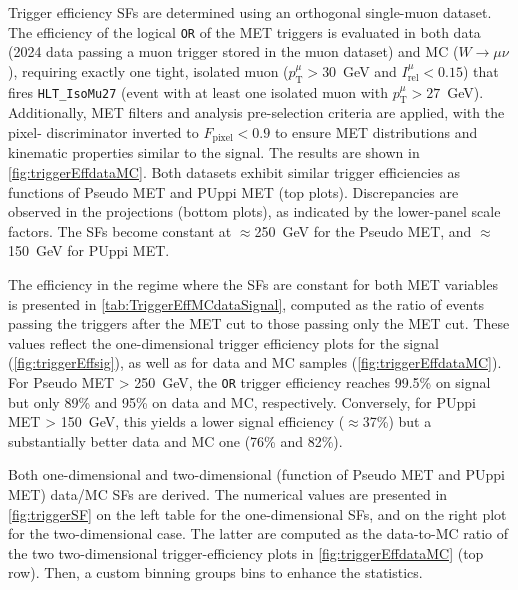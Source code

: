 Trigger efficiency SFs are determined using an orthogonal single-muon dataset. The efficiency of the logical \texttt{OR} of the MET triggers is evaluated in both data (2024 data passing a muon trigger stored in the muon dataset) and MC ($W\to\mu\nu$), requiring exactly one tight, isolated muon ($p_{\mathrm{T}}^\mu>30$~GeV and $I_{\text{rel}}^\mu<0.15$) that fires \texttt{HLT\_IsoMu27} (event with at least one isolated muon with $p_{\mathrm{T}}^\mu>27$~GeV). Additionally, MET filters and analysis pre-selection criteria are applied, with the pixel-\dedx{} discriminator inverted to $F_{\text{pixel}}<0.9$ to ensure MET distributions and kinematic properties similar to the signal. The results are shown in \cref{fig:triggerEffdataMC}. Both datasets exhibit similar trigger efficiencies as functions of Pseudo MET and PUppi MET (top plots). Discrepancies are observed in the projections (bottom plots), as indicated by the lower-panel scale factors. The SFs become constant at $\approx$250~GeV for the Pseudo MET, and $\approx$150~GeV for PUppi MET.

\vspace{0.5 cm}

The efficiency in the regime where the SFs are constant for both MET variables is presented in \cref{tab:TriggerEffMCdataSignal}, computed as the ratio of events passing the triggers after the MET cut to those passing only the MET cut. These values reflect the one-dimensional trigger efficiency plots for the signal (\cref{fig:triggerEffsig}), as well as for data and MC samples (\cref{fig:triggerEffdataMC}). For Pseudo MET > 250~GeV, the \texttt{OR} trigger efficiency reaches 99.5\% on signal but only 89\% and 95\% on data and MC, respectively. Conversely, for PUppi MET > 150~GeV, this yields a lower signal efficiency ($\approx$37\%) but a substantially better data and MC one (76\% and 82\%).

Both one-dimensional and two-dimensional (function of Pseudo MET and PUppi MET) data/MC SFs are derived. The numerical values are presented in \cref{fig:triggerSF} on the left table for the one-dimensional SFs, and on the right plot for the two-dimensional case. The latter are computed as the data-to-MC ratio of the two two-dimensional trigger-efficiency plots in \cref{fig:triggerEffdataMC} (top row). Then, a custom binning groups bins to enhance the statistics.

